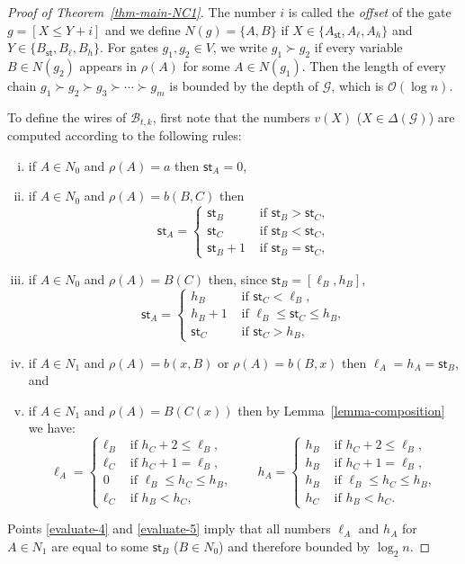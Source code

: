 \documentclass[a4paper,UKenglish,cleveref, autoref, thm-restate, numberwithinsect]{lipics-v2021}
\newcommand{\hs}{\mathsf{st}}
\begin{document}
\begin{proof}[Proof of Theorem~\ref{thm-main-NC1}]
The number $i$ is called the \emph{offset} of the gate $g = [X \leq Y+i]$ 
and we define $N(g) = \{A,B\}$ if  $X \in \{ A_\hs, A_\ell, A_h\}$ and $Y \in \{ B_\hs, B_\ell, B_h\}$. For gates $g_1, g_2 \in V$, we write
$g_1 \succ g_2$ if every variable $B \in N(g_2)$ appears in $\rho(A)$ for some $A \in N(g_1)$. Then the length of every chain 
$g_1 \succ g_2 \succ g_3 \succ \cdots \succ  g_m$ is bounded by the depth of $\mathcal{G}$, which is $\mathcal{O}(\log n)$.

To define the wires of $\mathcal{B}_{t,k}$, 
first note that the numbers $v(X)$ ($X \in \Delta(\mathcal{G})$)
are computed according to the following rules:
\begin{enumerate}[(i)]
\item \label{evaluate-1} if $A \in N_0$ and $\rho(A)=a$ then $\hs_A = 0$,
\item \label{evaluate-2} if $A \in N_0$ and $\rho(A) = b(B,C)$ then 
\[
\hs_A = \begin{cases}
\hs_B & \text{ if } \hs_B > \hs_C, \\
\hs_C &\text{ if } \hs_B < \hs_C, \\
\hs_B+1 & \text{ if } \hs_B = \hs_C,
\end{cases}
\]
\item \label{evaluate-3} if $A \in N_0$ and $\rho(A) = B(C)$ then, since $\hs_B = [\ell_B, h_B]$,
\[
\hs_A = \begin{cases}
h_B & \text{ if } \hs_C < \ell_B, \\
h_B+1 &\text{ if } \ell_B \le \hs_C \le h_B, \\
\hs_C & \text{ if } \hs_C > h_B,
\end{cases}
\]
\item \label{evaluate-4} if $A \in N_1$ and $\rho(A) = b(x,B)$ or $\rho(A) = b(B,x)$ then
$\ell_A = h_A = \hs_B$, and
\item \label{evaluate-5} if $A \in N_1$ and $\rho(A) = B(C(x))$ then by Lemma~\ref{lemma-composition} we have:
\begin{equation} \label{case-B(C(x))}
\ell_A = \begin{cases}
\ell_B & \text{ if } h_C + 2 \le \ell_B, \\
\ell_C & \text{ if }  h_C + 1 = \ell_B, \\
0 & \text{ if $\ell_B \le h_C \le h_B$,} \\
\ell_C & \text{ if } h_B < h_C,
\end{cases} \qquad
h_A = \begin{cases}
h_B & \text{ if } h_C + 2 \le \ell_B, \\
h_B & \text{ if }  h_C + 1 = \ell_B, \\
h_B & \text{ if } \ell_B \le h_C \le h_B, \\
h_C & \text{ if } h_B < h_C.
\end{cases}
\end{equation}
\end{enumerate}
Points \eqref{evaluate-4} and \eqref{evaluate-5} imply that all numbers $\ell_A$ and $h_A$ for $A \in N_1$ are equal to some $\hs_B$ ($B \in N_0$) and therefore bounded by $\log_2 n$.


\end{proof}
\end{document}
